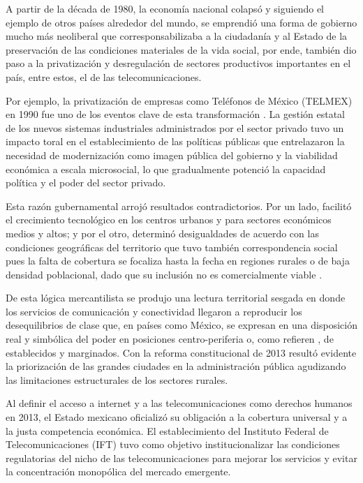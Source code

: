 \documentclass[
  spanish,
  11pt,
  a4paper,
]{scrbook}
\begin{document}
A partir de la década de 1980, la economía nacional colapsó y siguiendo
el ejemplo de otros países alrededor del mundo, se emprendió una forma
de gobierno mucho más neoliberal que corresponsabilizaba a la ciudadanía
y al Estado de la preservación de las condiciones materiales de la vida
social, por ende, también dio paso a la privatización y desregulación de
sectores productivos importantes en el país, entre estos, el de las
telecomunicaciones.

Por ejemplo, la privatización de empresas como Teléfonos de México
(TELMEX) en 1990 fue uno de los eventos clave de esta transformación
\autocite{Castaneda2013}. La gestión estatal de los nuevos sistemas
industriales administrados por el sector privado tuvo un impacto toral
en el establecimiento de las políticas públicas que entrelazaron la
necesidad de modernización como imagen pública del gobierno y la
viabilidad económica a escala microsocial, lo que gradualmente potenció
la capacidad política y el poder del sector privado.

Esta razón gubernamental arrojó resultados contradictorios. Por un lado,
facilitó el crecimiento tecnológico en los centros urbanos y para
sectores económicos medios y altos; y por el otro, determinó
desigualdades de acuerdo con las condiciones geográficas del territorio
que tuvo también correspondencia social pues la falta de cobertura se
focaliza hasta la fecha en regiones rurales o de baja densidad
poblacional, dado que su inclusión no es comercialmente viable
\autocite{Mariscal2007}.

De esta lógica mercantilista se produjo una lectura territorial sesgada
en donde los servicios de comunicación y conectividad llegaron a
reproducir los desequilibrios de clase que, en países como México, se
expresan en una disposición real y simbólica del poder en posiciones
centro-periferia o, como refieren \textcite{Elias2015}, de establecidos
y marginados. Con la reforma constitucional de 2013 resultó evidente la
priorización de las grandes ciudades en la administración pública
agudizando las limitaciones estructurales de los sectores rurales.

Al definir el acceso a internet y a las telecomunicaciones como derechos
humanos en 2013, el Estado mexicano oficializó su obligación a la
cobertura universal y a la justa competencia económica. El
establecimiento del Instituto Federal de Telecomunicaciones (IFT) tuvo
como objetivo institucionalizar las condiciones regulatorias del nicho
de las telecomunicaciones para mejorar los servicios y evitar la
concentración monopólica del mercado emergente.
\end{document}
